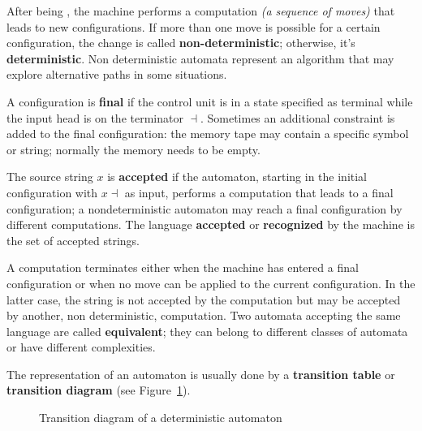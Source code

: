 \documentclass[english]{article}
\begin{document}
After being , the machine performs a computation \textit{(a sequence of moves)} that leads to new configurations.
If more than one move is possible for a certain configuration, the change is called \textbf{non-deterministic};
otherwise, it's \textbf{deterministic}.
Non deterministic automata represent an algorithm that may explore alternative paths in some situations.

A configuration is \textbf{final} if the control unit is in a state specified as terminal while the input head is on the terminator \(\dashv\).
Sometimes an additional constraint is added to the final configuration: the memory tape may contain a specific symbol or string;
normally the memory needs to be empty.

The source string \(x\) is \textbf{accepted} if the automaton, starting in the initial configuration with \(x \dashv\) as input, performs a computation that leads to a final configuration;
a nondeterministic automaton may reach a final configuration by different computations.
The language \textbf{accepted} or \textbf{recognized} by the machine is the set of accepted strings.

A computation terminates either when the machine has entered a final configuration or when no move can be applied to the current configuration.
In the latter case, the string is not accepted by the computation but may be accepted by another, non deterministic, computation.
Two automata accepting the same language are called \textbf{equivalent};
they can belong to different classes of automata or have different complexities.

\bigskip
The representation of an automaton is usually done by a \textbf{transition table} or \textbf{transition diagram} (see Figure~\ref{fig:transition-diagram}).

\begin{figure}[htbp]
  \centering
  \bigskip
  \bigskip
  \caption{Transition diagram of a deterministic automaton}
  \label{fig:transition-diagram}
\end{figure}
\end{document}

